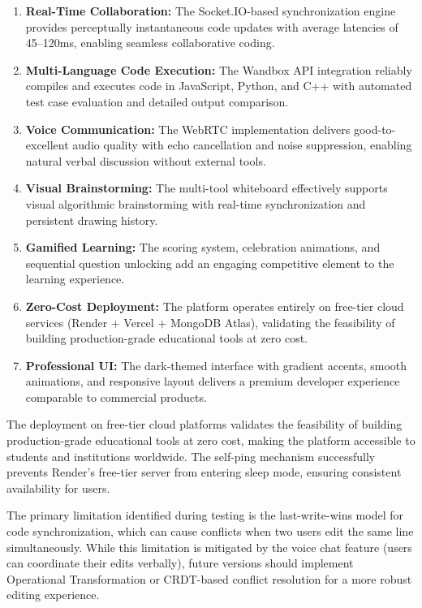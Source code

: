 \begin{enumerate}[label=\arabic*.]
    \item \textbf{Real-Time Collaboration:} The Socket.IO-based synchronization engine provides perceptually instantaneous code updates with average latencies of 45--120ms, enabling seamless collaborative coding.
    \item \textbf{Multi-Language Code Execution:} The Wandbox API integration reliably compiles and executes code in JavaScript, Python, and C++ with automated test case evaluation and detailed output comparison.
    \item \textbf{Voice Communication:} The WebRTC implementation delivers good-to-excellent audio quality with echo cancellation and noise suppression, enabling natural verbal discussion without external tools.
    \item \textbf{Visual Brainstorming:} The multi-tool whiteboard effectively supports visual algorithmic brainstorming with real-time synchronization and persistent drawing history.
    \item \textbf{Gamified Learning:} The scoring system, celebration animations, and sequential question unlocking add an engaging competitive element to the learning experience.
    \item \textbf{Zero-Cost Deployment:} The platform operates entirely on free-tier cloud services (Render + Vercel + MongoDB Atlas), validating the feasibility of building production-grade educational tools at zero cost.
    \item \textbf{Professional UI:} The dark-themed interface with gradient accents, smooth animations, and responsive layout delivers a premium developer experience comparable to commercial products.
\end{enumerate}

The deployment on free-tier cloud platforms validates the feasibility of building production-grade educational tools at zero cost, making the platform accessible to students and institutions worldwide. The self-ping mechanism successfully prevents Render's free-tier server from entering sleep mode, ensuring consistent availability for users.

The primary limitation identified during testing is the last-write-wins model for code synchronization, which can cause conflicts when two users edit the same line simultaneously. While this limitation is mitigated by the voice chat feature (users can coordinate their edits verbally), future versions should implement Operational Transformation or CRDT-based conflict resolution for a more robust editing experience.
